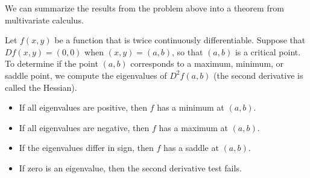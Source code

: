 \begin{problem}
\end{problem}

We can summarize the results from the problem above into a theorem from multivariate calculus. 
\begin{theorem}
 Let $f(x,y)$ be a function that is twice continuously differentiable. Suppose that $Df(x,y)=(0,0)$ when $(x,y)=(a,b)$, so that $(a,b)$ is a critical point. To determine if the point $(a,b)$ corresponds to a maximum, minimum, or saddle point, we compute the eigenvalues of $D^2f(a,b)$ (the second derivative is called the Hessian).
\begin{itemize}
 \item If all eigenvalues are positive, then $f$ has a minimum at $(a,b)$. 
 \item If all eigenvalues are negative, then $f$ has a maximum at $(a,b)$. 
 \item If the eigenvalues differ in sign, then $f$ has a saddle at $(a,b)$. 
 \item If zero is an eigenvalue, then the second derivative test fails.
\end{itemize}
\end{theorem}



\mysubsection{\ideapro}

